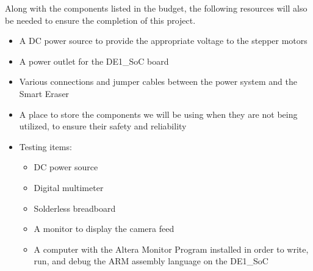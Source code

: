 Along with the components listed in the budget, the following resources will also be needed to ensure the completion of this project.
\begin{itemize}
	\item A DC power source to provide the appropriate voltage to the stepper motors
	\item A power outlet for the DE1\_SoC board
	\item Various connections and jumper cables between the power system and the Smart Eraser
	\item A place to store the components we will be using when they are not being utilized, to ensure their safety and reliability
	\item Testing items:
	\begin{itemize}
		\item DC power source
		\item Digital multimeter
		\item Solderless breadboard
		\item A monitor to display the camera feed
		\item A computer with the Altera Monitor Program installed in order to write, run, and debug the ARM assembly language on the DE1\_SoC
	\end{itemize}
\end{itemize}

\pagebreak
